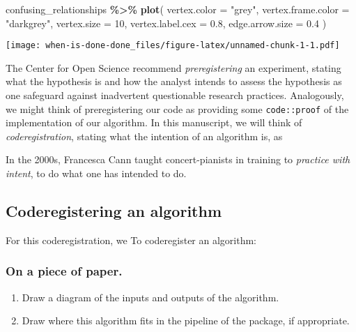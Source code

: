 \documentclass[
]{article}
\newenvironment{Shaded}{\begin{snugshade}}{\end{snugshade}}
\newcommand{\DataTypeTok}[1]{\textcolor[rgb]{0.13,0.29,0.53}{#1}}
\newcommand{\DecValTok}[1]{\textcolor[rgb]{0.00,0.00,0.81}{#1}}
\newcommand{\FloatTok}[1]{\textcolor[rgb]{0.00,0.00,0.81}{#1}}
\newcommand{\KeywordTok}[1]{\textcolor[rgb]{0.13,0.29,0.53}{\textbf{#1}}}
\newcommand{\NormalTok}[1]{#1}
\newcommand{\OperatorTok}[1]{\textcolor[rgb]{0.81,0.36,0.00}{\textbf{#1}}}
\newcommand{\StringTok}[1]{\textcolor[rgb]{0.31,0.60,0.02}{#1}}
\providecommand{\tightlist}{%
  \setlength{\itemsep}{0pt}\setlength{\parskip}{0pt}}
\begin{document}
\begin{Shaded}
\begin{Highlighting}[]
\NormalTok{confusing\_relationships }\OperatorTok{\%>\%}\StringTok{ }\KeywordTok{plot}\NormalTok{(}
             \DataTypeTok{vertex.color =} \StringTok{"grey"}\NormalTok{,}
             \DataTypeTok{vertex.frame.color =} \StringTok{"darkgrey"}\NormalTok{,}
             \DataTypeTok{vertex.size =} \DecValTok{10}\NormalTok{,}
             \DataTypeTok{vertex.label.cex =} \FloatTok{0.8}\NormalTok{,}
             \DataTypeTok{edge.arrow.size =} \FloatTok{0.4}
\NormalTok{             )}
\end{Highlighting}
\end{Shaded}

\texttt{[image: when-is-done-done\_files/figure-latex/unnamed-chunk-1-1.pdf]}

The Center for Open Science recommend \emph{preregistering} an
experiment, stating what the hypothesis is and how the analyst intends
to assess the hypothesis as one safeguard against inadvertent
questionable research practices. Analogously, we might think of
preregistering our code as providing some \texttt{code::proof} of the
implementation of our algorithm. In this manuscript, we will think of
\emph{coderegistration}, stating what the intention of an algorithm is,
as

In the 2000s, Francesca Cann taught concert-pianists in training to
\emph{practice with intent}, to do what one has intended to do.

\hypertarget{coderegistering-an-algorithm}{%
\subsection{Coderegistering an
algorithm}\label{coderegistering-an-algorithm}}

For this coderegistration, we To coderegister an algorithm:

\hypertarget{on-a-piece-of-paper.}{%
\subsubsection{On a piece of paper.}\label{on-a-piece-of-paper.}}

\begin{enumerate}
\def\labelenumi{\arabic{enumi}.}
\tightlist
\item
  Draw a diagram of the inputs and outputs of the algorithm.
\item
  Draw where this algorithm fits in the pipeline of the package, if
  appropriate.
\end{enumerate}
\end{document}
